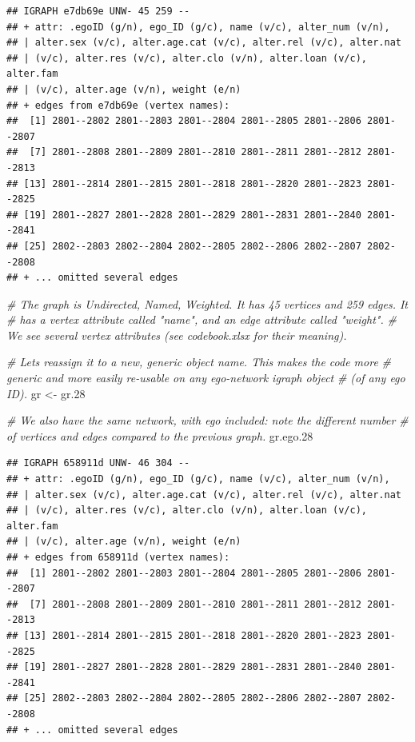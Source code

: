 \documentclass[
]{book}
\newenvironment{Shaded}{\begin{snugshade}}{\end{snugshade}}
\newcommand{\CommentTok}[1]{\textcolor[rgb]{0.56,0.35,0.01}{\textit{#1}}}
\newcommand{\FloatTok}[1]{\textcolor[rgb]{0.00,0.00,0.81}{#1}}
\newcommand{\NormalTok}[1]{#1}
\newcommand{\OtherTok}[1]{\textcolor[rgb]{0.56,0.35,0.01}{#1}}
\begin{document}
\begin{verbatim}
## IGRAPH e7db69e UNW- 45 259 -- 
## + attr: .egoID (g/n), ego_ID (g/c), name (v/c), alter_num (v/n),
## | alter.sex (v/c), alter.age.cat (v/c), alter.rel (v/c), alter.nat
## | (v/c), alter.res (v/c), alter.clo (v/n), alter.loan (v/c), alter.fam
## | (v/c), alter.age (v/n), weight (e/n)
## + edges from e7db69e (vertex names):
##  [1] 2801--2802 2801--2803 2801--2804 2801--2805 2801--2806 2801--2807
##  [7] 2801--2808 2801--2809 2801--2810 2801--2811 2801--2812 2801--2813
## [13] 2801--2814 2801--2815 2801--2818 2801--2820 2801--2823 2801--2825
## [19] 2801--2827 2801--2828 2801--2829 2801--2831 2801--2840 2801--2841
## [25] 2802--2803 2802--2804 2802--2805 2802--2806 2802--2807 2802--2808
## + ... omitted several edges
\end{verbatim}

\begin{Shaded}
\begin{Highlighting}[]
\CommentTok{\# The graph is Undirected, Named, Weighted. It has 45 vertices and 259 edges. It}
\CommentTok{\# has a vertex attribute called "name", and an edge attribute called "weight". }
\CommentTok{\# We see several vertex attributes (see codebook.xlsx for their meaning).}

\CommentTok{\# Let\textquotesingle{}s reassign it to a new, generic object name. This makes the code more }
\CommentTok{\# generic and more easily re{-}usable on any ego{-}network igraph object }
\CommentTok{\# (of any ego ID).}
\NormalTok{gr }\OtherTok{\textless{}{-}}\NormalTok{ gr}\FloatTok{.28}

\CommentTok{\# We also have the same network, with ego included: note the different number}
\CommentTok{\# of vertices and edges compared to the previous graph.}
\NormalTok{gr.ego}\FloatTok{.28}
\end{Highlighting}
\end{Shaded}

\begin{verbatim}
## IGRAPH 658911d UNW- 46 304 -- 
## + attr: .egoID (g/n), ego_ID (g/c), name (v/c), alter_num (v/n),
## | alter.sex (v/c), alter.age.cat (v/c), alter.rel (v/c), alter.nat
## | (v/c), alter.res (v/c), alter.clo (v/n), alter.loan (v/c), alter.fam
## | (v/c), alter.age (v/n), weight (e/n)
## + edges from 658911d (vertex names):
##  [1] 2801--2802 2801--2803 2801--2804 2801--2805 2801--2806 2801--2807
##  [7] 2801--2808 2801--2809 2801--2810 2801--2811 2801--2812 2801--2813
## [13] 2801--2814 2801--2815 2801--2818 2801--2820 2801--2823 2801--2825
## [19] 2801--2827 2801--2828 2801--2829 2801--2831 2801--2840 2801--2841
## [25] 2802--2803 2802--2804 2802--2805 2802--2806 2802--2807 2802--2808
## + ... omitted several edges
\end{verbatim}
\end{document}
